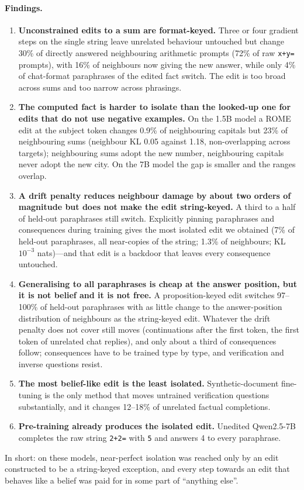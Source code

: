 \paragraph{Findings.}
\begin{enumerate}\setlength\itemsep{1pt}
\item \textbf{Unconstrained edits to a sum are format-keyed.} Three or four gradient steps on the single string leave unrelated behaviour untouched but change 30\% of directly answered neighbouring arithmetic prompts (72\% of raw \texttt{x+y=} prompts), with 16\% of neighbours now giving the new answer, while only 4\% of chat-format paraphrases of the edited fact switch. The edit is too broad across sums and too narrow across phrasings.
\item \textbf{The computed fact is harder to isolate than the looked-up one for edits that do not use negative examples.} On the 1.5B model a ROME edit at the subject token changes 0.9\% of neighbouring capitals but 23\% of neighbouring sums (neighbour KL 0.05 against 1.18, non-overlapping across targets); neighbouring sums adopt the new number, neighbouring capitals never adopt the new city. On the 7B model the gap is smaller and the ranges overlap.
\item \textbf{A drift penalty reduces neighbour damage by about two orders of magnitude but does not make the edit string-keyed.} A third to a half of held-out paraphrases still switch. Explicitly pinning paraphrases and consequences during training gives the most isolated edit we obtained (7\% of held-out paraphrases, all near-copies of the string; 1.3\% of neighbours; KL $10^{-3}$ nats)---and that edit is a backdoor that leaves every consequence untouched.
\item \textbf{Generalising to all paraphrases is cheap at the answer position, but it is not belief and it is not free.} A proposition-keyed edit switches 97--100\% of held-out paraphrases with as little change to the answer-position distribution of neighbours as the string-keyed edit. Whatever the drift penalty does not cover still moves (continuations after the first token, the first token of unrelated chat replies), and only about a third of consequences follow; consequences have to be trained type by type, and verification and inverse questions resist.
\item \textbf{The most belief-like edit is the least isolated.} Synthetic-document fine-tuning is the only method that moves untrained verification questions substantially, and it changes 12--18\% of unrelated factual completions.
\item \textbf{Pre-training already produces the isolated edit.} Unedited Qwen2.5-7B completes the raw string \texttt{2+2=} with \texttt{5} and answers 4 to every paraphrase.
\end{enumerate}
In short: on these models, near-perfect isolation was reached only by an edit constructed to be a string-keyed exception, and every step towards an edit that behaves like a belief was paid for in some part of ``anything else''.
